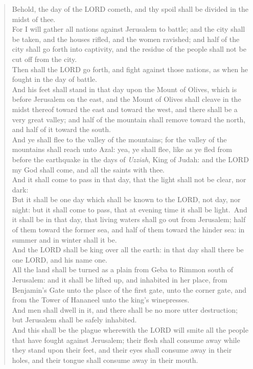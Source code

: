 \documentclass[MAIN]{subfiles}
\begin{document}
\begin{verse}
Behold, the day of the {\hge LORD} cometh, and thy spoil shall be divided in the midst of thee.\\
For I will gather all nations against {\sc Jerusalem} to battle; and the city shall be taken, and the houses rifled, and the women ravished; and half of the city shall go forth into captivity, and the residue of the people shall not be cut off from the city.\\
Then shall the {\hge LORD} go forth, and fight against those nations, as when he fought in the day of battle.\\
And his feet shall stand in that day upon the {\sc Mount of Olives}, which is before {\sc Jerusalem} on the east, and the {\sc Mount of Olives} shall cleave in the midst thereof toward the east and toward the west, and there shall be a very great valley; and half of the mountain shall remove toward the north, and half of it toward the south.\\
And ye shall flee to the valley of the mountains; for the valley of the mountains shall reach unto {\sc Azal}: yea, ye shall flee, like as ye fled from before the earthquake in the days of \emph{Uzziah}, King of Judah: and the {\hge LORD} my God shall come, and all the saints with thee.\\
And it shall come to pass in that day, that the light shall not be clear, nor dark:\\
But it shall be one day which shall be known to the {\hge LORD}, not day, nor night: but it shall come to pass, that at evening time it shall be light.\
And it shall be in that day, that living waters shall go out from {\sc Jerusalem}; half of them toward the former sea, and half of them toward the hinder sea: in summer and in winter shall it be.\\
And the {\hge LORD} shall be king over all the earth: in that day shall there be one {\hge LORD}, and his name one.\\
All the land shall be turned as a plain from {\sc Geba} to {\sc Rimmon} south of {\sc Jerusalem}: and it shall be lifted up, and inhabited in her place, from {\sc Benjamin's Gate} unto the place of the first gate, unto the corner gate, and from the {\sc Tower of Hananeel} unto the king's winepresses.\\
And men shall dwell in it, and there shall be no more utter destruction; but {\sc Jerusalem} shall be safely inhabited.\\
And this shall be the plague wherewith the {\hge LORD} will smite all the people that have fought against {\sc Jerusalem}; their flesh shall consume away while they stand upon their feet, and their eyes shall consume away in their holes, and their tongue shall consume away in their mouth.
\end{verse}
\end{document}
